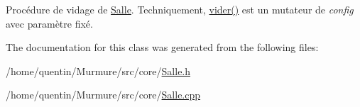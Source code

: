 Procédure de vidage de \hyperlink{classSalle}{Salle}. Techniquement, \hyperlink{classSalle_ae8248a5ded8514be67a29efdeb70af96}{vider()} est un mutateur de {\itshape config} avec paramètre fixé. 



The documentation for this class was generated from the following files\+:\begin{DoxyCompactItemize}
\item 
/home/quentin/\+Murmure/src/core/\hyperlink{Salle_8h}{Salle.\+h}\item 
/home/quentin/\+Murmure/src/core/\hyperlink{Salle_8cpp}{Salle.\+cpp}\end{DoxyCompactItemize}

